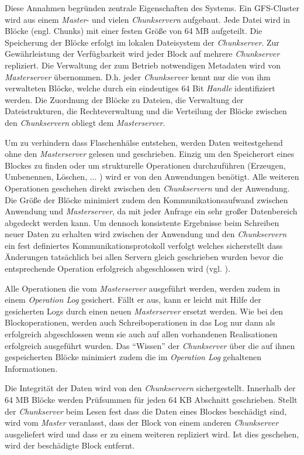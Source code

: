 Diese Annahmen begründen zentrale Eigenschaften des Systems. Ein \acs{GFS}-Cluster wird aus einem \textit{Master}- und vielen \textit{Chunkservern} aufgebaut. Jede Datei wird in Blöcke (engl. Chunks) mit einer festen Größe von 64 MB aufgeteilt. Die Speicherung der Blöcke erfolgt im lokalen Dateisystem der \textit{Chunkserver}. Zur Gewährleistung der Verfügbarkeit wird jeder Block auf mehrere \textit{Chunkserver} repliziert. Die Verwaltung der zum Betrieb notwendigen Metadaten wird von \textit{Masterserver} übernommen. D.h. jeder \textit{Chunkserver} kennt nur die von ihm verwalteten Blöcke, welche durch ein eindeutiges 64 Bit \textit{Handle} identifiziert werden. Die Zuordnung der Blöcke zu Dateien, die Verwaltung der Dateistrukturen, die Rechteverwaltung und die Verteilung der Blöcke zwischen den \textit{Chunkservern} obliegt dem \textit{Masterserver}.

Um zu verhindern dass Flaschenhälse entstehen, werden Daten weitestgehend ohne den \textit{Masterserver} gelesen und geschrieben. Einzig um den Speicherort eines Blockes zu finden oder um strukturelle Operationen durchzuführen (Erzeugen, Umbenennen, Löschen, ... ) wird er von den Anwendungen benötigt. Alle weiteren Operationen geschehen direkt zwischen den \textit{Chunkservern} und der Anwendung. Die Größe der Blöcke minimiert zudem den Kommunikationsaufwand zwischen Anwendung und \textit{Masterserver}, da mit jeder Anfrage ein sehr großer Datenbereich abgedeckt werden kann. Um dennoch konsistente Ergebnisse beim Schreiben neuer Daten zu erhalten wird zwischen der Anwendung und den \textit{Chunkservern} ein fest definiertes Kommunikationsprotokoll verfolgt welches sicherstellt dass Änderungen tatsächlich bei allen Servern gleich geschrieben wurden bevor die entsprechende Operation erfolgreich abgeschlossen wird (vgl. \citep[Kap. 3]{ghemawat03}).

Alle Operationen die vom \textit{Masterserver} ausgeführt werden, werden zudem in einem \textit{Operation Log} gesichert. Fällt er aus, kann er leicht mit Hilfe der gesicherten Logs  durch einen neuen \textit{Masterserver} ersetzt werden. Wie bei den Blockoperationen, werden auch Schreiboperationen in das Log nur dann als erfolgreich abgeschlossen wenn sie auch auf allen vorhandenen Realisationen erfolgreich ausgeführt wurden. Das ``Wissen'' der \textit{Chunkserver} über die auf ihnen gespeicherten Blöcke minimiert zudem die im \textit{Operation Log} gehaltenen Informationen.

Die Integrität der Daten wird von den \textit{Chunkservern} sichergestellt. Innerhalb der 64 MB Blöcke werden Prüfsummen für jeden 64 KB Abschnitt geschrieben. Stellt der \textit{Chunkserver} beim Lesen fest dass die Daten eines Blockes beschädigt sind, wird vom \textit{Master} veranlasst, dass der Block von einem anderen \textit{Chunkserver} ausgeliefert wird und dass er zu einem weiteren repliziert wird. Ist dies geschehen, wird der beschädigte Block entfernt.

